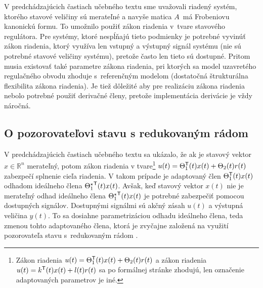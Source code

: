 \documentclass[a4paper, 10pt, ]{article}
\begin{document}




\lettrine[lines=3, nindent=0pt]{V}{} predchádzajúcich častiach učebného textu sme uvažovali riadený systém, ktorého stavové veličiny sú merateľné a navyše matica $A$~má Frobeniovu kanonickú formu. To umožnilo použiť zákon riadenia v~tvare stavového regulátora. Pre systémy, ktoré nespĺňajú tieto podmienky je potrebné vyvinúť zákon riadenia, ktorý využíva len vstupný a výstupný signál systému (nie sú potrebné stavové veličiny systému), pretože často len tieto sú dostupné. Pritom musia existovať také parametre zákona riadenia, pri ktorých sa model uzavretého regulačného obvodu zhoduje s~referenčným modelom (dostatočná štrukturálna flexibilita zákona riadenia). Je tiež dôležité aby pre realizáciu zákona riadenia nebolo potrebné použiť derivačné členy, pretože implementácia derivácie je vždy náročná.






\subsection{O pozorovateľovi stavu s redukovaným rádom}





V predchádzajúcich častiach učebného textu sa ukázalo, že ak je stavový vektor $x \in \mathbb{R}^n$ merateľný, potom zákon riadenia v tvare\footnote{Zákon riadenia $u(t) = \Theta_1^{\mathsf{T}}(t) x(t) + \Theta_2(t) r(t)$ a zákon riadenia $u(t) = k^{\mathsf{T}}(t) x(t) + l(t) r(t)$ sa po formálnej stránke zhodujú, len označenie adaptovaných parametrov je iné.} $u(t) = \Theta_1^{\mathsf{T}}(t) x(t) + \Theta_2(t) r(t)$ zabezpečí splnenie cieľa riadenia. V takom prípade je adaptovaný člen $\Theta_1^{\mathsf{T}}(t) x(t)$ odhadom ideálneho člena ${\Theta_1^\star}^{\mathsf{T}}(t) x(t)$. Avšak, keď stavový vektor $x(t)$ nie je merateľný odhad ideálneho člena ${\Theta_1^\star}^{\mathsf{T}}(t) x(t)$ je potrebné zabezpečiť pomocou dostupných signálov. Dostupnými signálmi sú akčný zásah $u(t)$ a výstupná veličina $y(t)$. To sa dosiahne parametrizáciou odhadu ideálneho člena, teda zmenou tohto adaptovaného člena, ktorá je zvyčajne založená na využití pozorovateľa stavu s~redukovaným rádom \cite{Tao2003}.
\end{document}
